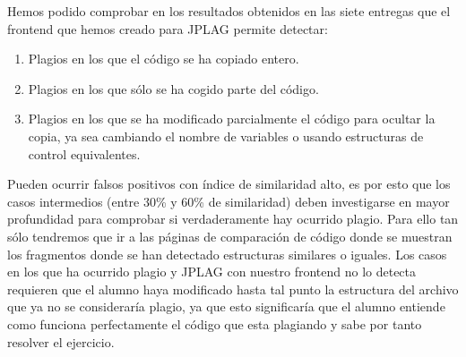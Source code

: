 Hemos podido comprobar en los resultados obtenidos en las siete entregas que el frontend que hemos creado para JPLAG permite detectar:
\begin{enumerate}
\item Plagios en los que el código se ha copiado entero.
\item Plagios en los que sólo se ha cogido parte del código.
\item Plagios en los que se ha modificado parcialmente el código para ocultar la copia, ya sea cambiando el nombre de variables o usando estructuras de control equivalentes.
\end{enumerate}
Pueden ocurrir falsos positivos con índice de similaridad alto, es por esto que los casos intermedios (entre 30\% y 60\% de similaridad) deben investigarse en mayor profundidad para comprobar si verdaderamente hay ocurrido plagio.
\newline
Para ello tan sólo tendremos que ir a las páginas de comparación de código donde se muestran los fragmentos donde se han detectado estructuras similares o iguales.
\newline
Los casos en los que ha ocurrido plagio y JPLAG con nuestro frontend no lo detecta requieren que el alumno haya modificado hasta tal punto la estructura del archivo que ya no se consideraría plagio, ya que esto significaría que el alumno entiende como funciona perfectamente el código que esta plagiando y sabe por tanto resolver el ejercicio.















